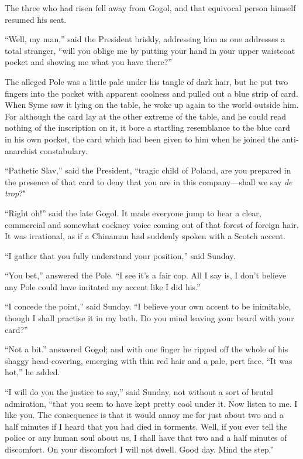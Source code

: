 \documentclass{book}
\begin{document}
The three who had risen fell away from Gogol, and that equivocal person himself resumed his seat.

“Well, my man,” said the President briskly, addressing him as one addresses a total stranger, “will you oblige me by putting your hand in your upper waistcoat pocket and showing me what you have there?”

The alleged Pole was a little pale under his tangle of dark hair, but he put two fingers into the pocket with apparent coolness and pulled out a blue strip of card. When Syme saw it lying on the table, he woke up again to the world outside him. For although the card lay at the other extreme of the table, and he could read nothing of the inscription on it, it bore a startling resemblance to the blue card in his own pocket, the card which had been given to him when he joined the anti-anarchist constabulary.

“Pathetic Slav,” said the President, “tragic child of Poland, are you prepared in the presence of that card to deny that you are in this company—shall we say \emph{de trop}?"

“Right oh!” said the late Gogol. It made everyone jump to hear a clear, commercial and somewhat cockney voice coming out of that forest of foreign hair. It was irrational, as if a Chinaman had suddenly spoken with a Scotch accent.

“I gather that you fully understand your position,” said Sunday.

“You bet,” answered the Pole. “I see it’s a fair cop. All I say is, I don’t believe any Pole could have imitated my accent like I did his.”

“I concede the point,” said Sunday. “I believe your own accent to be inimitable, though I shall practise it in my bath. Do you mind leaving your beard with your card?”

“Not a bit.” answered Gogol; and with one finger he ripped off the whole of his shaggy head-covering, emerging with thin red hair and a pale, pert face. “It was hot,” he added.

“I will do you the justice to say,” said Sunday, not without a sort of brutal admiration, “that you seem to have kept pretty cool under it. Now listen to me. I like you. The consequence is that it would annoy me for just about two and a half minutes if I heard that you had died in torments. Well, if you ever tell the police or any human soul about us, I shall have that two and a half minutes of discomfort. On your discomfort I will not dwell. Good day. Mind the step.”
\end{document}
